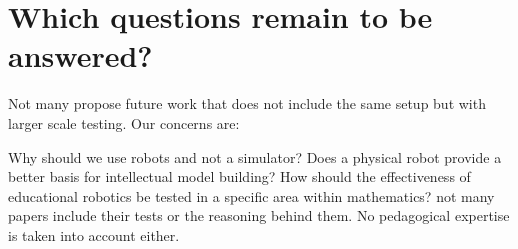 \section{Which questions remain to be answered?}
Not many propose future work that does not include the same setup but with larger scale testing. Our concerns are:

Why should we use robots and not a simulator?
Does a physical robot provide a better basis for intellectual model building?
How should the effectiveness of educational robotics be tested in a specific area within mathematics? not many papers include their tests or the reasoning behind them. No pedagogical expertise is taken into account either.  
